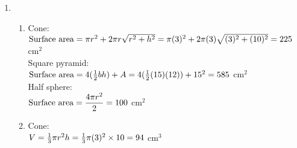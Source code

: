 \begin{eocsolutions}{}
{\begin{enumerate}[itemsep=5pt, label=\textbf{\arabic*}. ]
\begin{enumerate}[itemsep=5pt, label=\textbf{(\alph*)} ]
Triangular prism:  \\
$\mbox{Surface area} = 2(\frac{1}{2}b \times h) + 2(H \times S) + (H \times b)\\
= 2(\frac{9}{2}(8)(3)) + 18(20 \times 5 ) + 9(20 \times 8)\\
= 3~456 ~$cm$^{2}$\\

Rectangular prism:\\
$\mbox{ Surface area} = 2[9(L \times b) + 9(b \times h) + 9(L \times h)] \\
= 2[9(5 \times 4) + 9(4 \times 2) + 9(5 \times 2)] \\
= 684 ~$cm$^{2}$

\item Cylinder: \\
$\mbox{Volume} = \pi 3r^2 3h \\
\pi (3(4))^2(3(10))\\
= 13~571,9 ~$cm$^{3}$ \\

Triangular prism:  \\
$\mbox{Volume} = \frac{1}{2} \times h \times b \times H\\
= \frac{27}{2}(3)(8)(20)\\
= 6480 ~$cm$^{3}$ \\

Rectangular prism:\\
$\mbox{Volume} = 27(L \times b \times h)\\
= 27(5 \times 4 \times 2) \\
= 1080 ~ $cm$^{3}$ 
      \end{enumerate}
\item \begin{enumerate}[itemsep=5pt, label=\textbf{(\alph*)} ]
\item Cone:\\
$\mbox{Surface area} = \pi r^2 + 2 \pi r \sqrt{r^2 + h^2} \\
= \pi (3)^2 + 2\pi (3) \sqrt{(3)^2 + (10)^2}\\
= 225 ~$cm$^{2}$\\

Square pyramid:\\
$\mbox{Surface area} = 4(\frac{1}{2}bh)+A\\
= 4(\frac{1}{2} (15)(12))+15^2 \\
= 585 ~$cm$^{2}$\\

Half sphere:\\
$\mbox{Surface area} = \dfrac{4 \pi r^2}{2}\\
= 100 ~$cm$^{2}$
\item Cone:\\
$V = \frac{1}{3} \pi r^{2} h \\
= \frac{1}{3} \pi (3)^2 \times 10 \\
= 94 ~$cm$^{3}$\\


\end{enumerate}
\end{enumerate}}
\end{eocsolutions}
